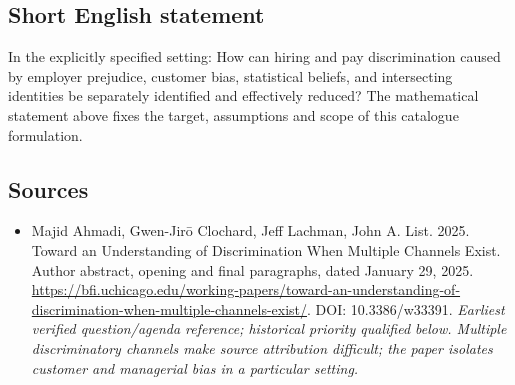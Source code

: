 \documentclass[11pt]{article}
\begin{document}
\subsection{Short English statement}
In the explicitly specified setting: How can hiring and pay discrimination caused by employer prejudice, customer bias, statistical beliefs, and intersecting identities be separately identified and effectively reduced? The mathematical statement above fixes the target, assumptions and scope of this catalogue formulation.

\subsection{Sources}
\begin{itemize}\raggedright
\item[\textnormal{[S1]}]\hypertarget{source:30007638:1}{} Majid Ahmadi, Gwen-Jirō Clochard, Jeff Lachman, John A. List. 2025. Toward an Understanding of Discrimination When Multiple Channels Exist. Author abstract, opening and final paragraphs, dated January 29, 2025.
\url{https://bfi.uchicago.edu/working-papers/toward-an-understanding-of-discrimination-when-multiple-channels-exist/}.
DOI: 10.3386/w33391.
{\small\textit{Earliest verified question/agenda reference; historical priority qualified below. Multiple discriminatory channels make source attribution difficult; the paper isolates customer and managerial bias in a particular setting.}}
\end{itemize}
\end{document}
